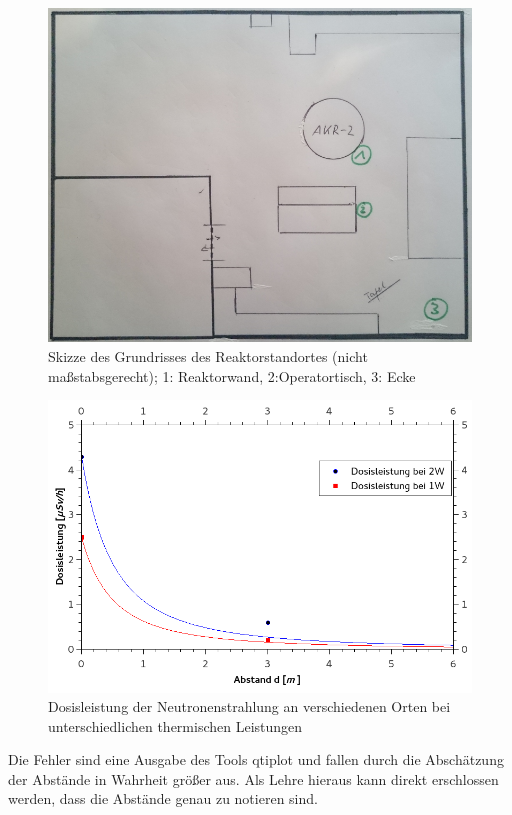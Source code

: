    \begin{figure}
        \centering
        \includegraphics[scale=0.4]{pic/skizze_grundriss}
        \caption{Skizze des Grundrisses des Reaktorstandortes (nicht maßstabsgerecht); 1: Reaktorwand, 2:Operatortisch, 3: Ecke}
        \label{skizze}
    \end{figure}
        \begin{figure}
               \centering
               \includegraphics[scale=0.5]{pic/Neutronendosisleistung_Abstand}
               \caption{Dosisleistung der Neutronenstrahlung an verschiedenen Orten bei unterschiedlichen thermischen Leistungen}
               \label{df:neu_abstand}
        \end{figure}
    Die Fehler sind eine Ausgabe des Tools qtiplot und fallen durch die Abschätzung der Abstände in Wahrheit größer aus. Als Lehre hieraus kann direkt erschlossen werden, dass die Abstände genau zu notieren sind.
